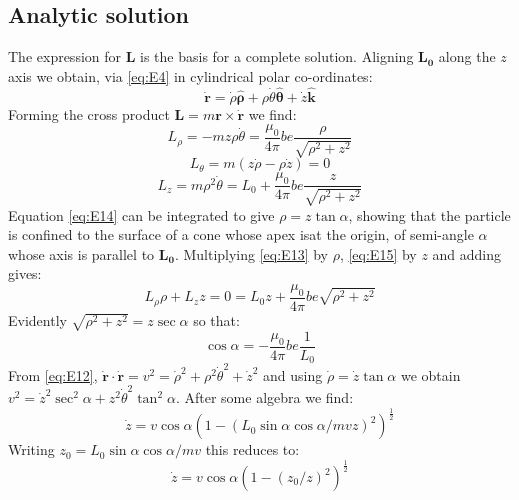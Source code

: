 \documentclass[twocolumn]{article}
\begin{document}
\subsection{Analytic solution}
The expression for $\mathbf {L}$ is the basis for a complete solution. Aligning $\mathbf {L_0} $ along the $z$ axis we obtain, via  \eqref{eq:E4} in cylindrical polar co-ordinates:
\begin{equation}
\label{eq:E12}
\mathbf {\dot{r}} =\dot{ \rho} \mathbf{\hat \rho }+\rho \dot{\theta}  \mathbf{ \hat \theta } + \dot{z} \mathbf{\hat k} 
\end{equation}
Forming the cross product $\mathbf{L} = m \mathbf{{r}} \times \mathbf{\dot r}$ we find:
\begin{equation}
\label{eq:E13}
L_\rho = -mz \rho \dot {\theta} = \frac {\mu_0 }{4 \pi } be \frac {\rho}{\sqrt{\rho^2+z^2}}
\end{equation}
\begin{equation}
\label{eq:E14}
L_\theta  = m ( z \dot\rho-\rho\dot z) = 0
\end{equation}
\begin{equation}
\label{eq:E15}
L_z  = m \rho^2 \dot\theta = L_0 + \frac {\mu_0 }{4 \pi } be \frac {z}{\sqrt{\rho^2+z^2}}
\end{equation}
Equation \eqref{eq:E14} can be integrated to give $\rho = z \tan\alpha$, showing that the particle is confined to the surface of a cone whose apex isat the origin, of semi-angle $\alpha$ whose axis is parallel to $\mathbf {L_0}$. Multiplying \eqref{eq:E13} by $\rho$, \eqref{eq:E15} by $z$ and adding gives:
\begin{equation}
\label{eq:E16}
L_\rho \rho +L_z z = 0= L_0 z  + \frac {\mu_0 }{4 \pi } be \sqrt{\rho^2+z^2}
\end{equation}
Evidently $ \sqrt{\rho^2+z^2} = z \sec\alpha $ so that:
\begin{equation}
\label{eq:E17}
\cos \alpha = - \frac {\mu_0 }{4 \pi } be \frac{1}{L_0}
\end{equation}
From \eqref{eq:E12}, $\mathbf {\dot{r}} \cdot \mathbf {\dot{r}} = v^2 = \dot\rho^2 +\rho^2\dot\theta^2 +\dot z^2 $ and using $ \dot\rho = \dot z \tan\alpha$ we obtain $v^2 = \dot z^2 \sec^2 \alpha + z^2\dot \theta^2 \tan^2 \alpha$. After some algebra we find:
\begin{equation}
\label{eq:E18}
\dot z = v \cos\alpha ( 1 - ({L_0 \sin\alpha \cos\alpha}/{mvz})^2)^\frac{1}{2}
\end{equation}
Writing $z_0 = {L_0 \sin\alpha \cos\alpha}/{mv}$ this reduces to:
\begin{equation}
\label{eq:E19}
\dot z = v \cos\alpha ( 1 - ({z_0}/{z})^2)^\frac{1}{2}
\end{equation}
\end{document}
